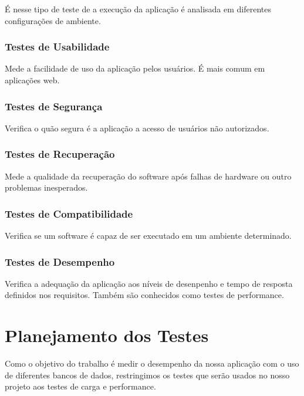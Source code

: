 É nesse tipo de teste de a execução da aplicação é analisada em diferentes configurações de ambiente.

\subsubsection{Testes de Usabilidade}

Mede a facilidade de uso da aplicação pelos usuários. É mais comum em aplicações web.

\subsubsection{Testes de Segurança}

Verifica o quão segura é a aplicação a acesso de usuários não autorizados.

\subsubsection{Testes de Recuperação}

Mede a qualidade da recuperação do software após falhas de hardware ou outro problemas inesperados.

\subsubsection{Testes de Compatibilidade}

Verifica se um software é capaz de ser executado em um ambiente determinado.

\subsubsection{Testes de Desempenho}

Verifica a adequação da aplicação aos níveis de desenpenho e tempo de resposta definidos nos requisitos. Também são conhecidos como testes de performance.




\section{Planejamento dos Testes}

Como o objetivo do trabalho é medir o desempenho da nossa aplicação com o uso de diferentes bancos de dados, restringimos os testes que serão usados no nosso projeto aos testes de carga e performance.

